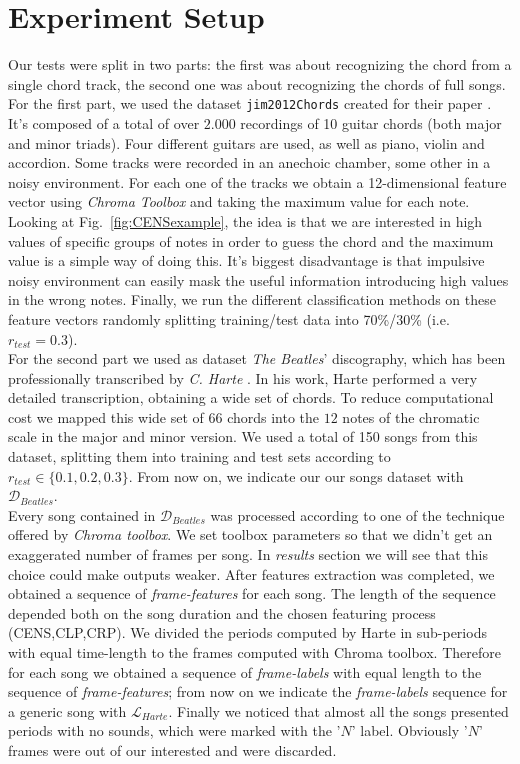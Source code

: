 \section{Experiment Setup}
\label{sec:setup}

Our tests were split in two parts: the first was about recognizing the chord from a single chord track, the second one was about recognizing the chords of full songs.\\
%
For the first part, we used the dataset \texttt{jim2012Chords} \cite{jim2012Chords} created for their paper \cite{JimChordsPaper}. It's composed of a total of over $2.000$ recordings of 10 guitar chords (both major and minor triads). Four different guitars are used, as well as piano, violin and accordion. Some tracks were recorded in an anechoic chamber, some other in a noisy environment. For each one of the tracks we obtain a 12-dimensional feature vector using \textit{Chroma Toolbox} and taking the maximum value for each note. Looking at Fig.~\ref{fig:CENSexample}, the idea is that we are interested in high values of specific groups of notes in order to guess the chord and the maximum value is a simple way of doing this. It's biggest disadvantage is that impulsive noisy environment can easily mask the useful information introducing high values in the wrong notes. Finally, we run the different classification methods on these feature vectors randomly splitting training/test data into 70\%/30\% (i.e. $r_{test}=0.3$).\\
%
For the second part we used as dataset \textit{The Beatles}' discography, which has been professionally transcribed by \textit{C. Harte} \cite{HartePaper}\cite{HarteThesis}. In his work, Harte performed a very detailed transcription, obtaining a wide set of chords. To reduce computational cost we mapped this wide set of $66$ chords into the $12$ notes of the chromatic scale in the major and minor version. We used a total of 150 songs from this dataset, splitting them into training and test sets according to $r_{test}\in \{0.1,0.2,0.3\}$. From now on, we indicate our our songs dataset with $\mathcal{D}_{Beatles}$. \\
%
Every song contained in $\mathcal{D}_{Beatles}$ was processed according to one of the technique offered by \textit{Chroma toolbox}. We set toolbox parameters so that we didn't get an exaggerated number of frames per song. In \textit{results} section we will see that this choice could make outputs weaker. After features extraction was completed, we obtained a sequence of \textit{frame-features} for each song. The length of the sequence depended both on the song duration and the chosen featuring process (CENS,CLP,CRP). We divided the periods computed by Harte in sub-periods with equal time-length to the frames computed with Chroma toolbox. Therefore for each song we obtained a sequence of \textit{frame-labels} with equal length to the sequence of \textit{frame-features}; from now on we indicate the \textit{frame-labels} sequence for a generic song with $\mathcal{L}_{Harte}$. Finally we noticed that almost all the songs presented periods with no sounds, which were marked with the '$N$' label. Obviously '$N$' frames were out of our interested and were discarded. \\
